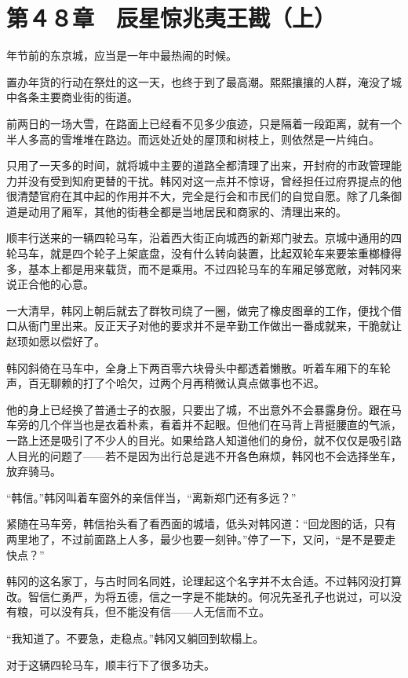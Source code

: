 \section{第４８章　辰星惊兆夷王戡（上）}

年节前的东京城，应当是一年中最热闹的时候。

置办年货的行动在祭灶的这一天，也终于到了最高潮。熙熙攘攘的人群，淹没了城中各条主要商业街的街道。

前两日的一场大雪，在路面上已经看不见多少痕迹，只是隔着一段距离，就有一个半人多高的雪堆堆在路边。而远处近处的屋顶和树枝上，则依然是一片纯白。

只用了一天多的时间，就将城中主要的道路全都清理了出来，开封府的市政管理能力并没有受到知府更替的干扰。韩冈对这一点并不惊讶，曾经担任过府界提点的他很清楚官府在其中起的作用并不大，完全是行会和市民们的自觉自愿。除了几条御道是动用了厢军，其他的街巷全都是当地居民和商家的、清理出来的。

顺丰行送来的一辆四轮马车，沿着西大街正向城西的新郑门驶去。京城中通用的四轮马车，就是四个轮子上架底盘，没有什么转向装置，比起双轮车来要笨重榔槺得多，基本上都是用来载货，而不是乘用。不过四轮马车的车厢足够宽敞，对韩冈来说正合他的心意。

一大清早，韩冈上朝后就去了群牧司绕了一圈，做完了橡皮图章的工作，便找个借口从衙门里出来。反正天子对他的要求并不是辛勤工作做出一番成就来，干脆就让赵顼如愿以偿好了。

韩冈斜倚在马车中，全身上下两百零六块骨头中都透着懒散。听着车厢下的车轮声，百无聊赖的打了个哈欠，过两个月再稍微认真点做事也不迟。

他的身上已经换了普通士子的衣服，只要出了城，不出意外不会暴露身份。跟在马车旁的几个伴当也是衣着朴素，看着并不起眼。但他们在马背上背挺腰直的气派，一路上还是吸引了不少人的目光。如果给路人知道他们的身份，就不仅仅是吸引路人目光的问题了——若不是因为出行总是逃不开各色麻烦，韩冈也不会选择坐车，放弃骑马。

“韩信。”韩冈叫着车窗外的亲信伴当，“离新郑门还有多远？”

紧随在马车旁，韩信抬头看了看西面的城墙，低头对韩冈道：“回龙图的话，只有两里地了，不过前面路上人多，最少也要一刻钟。”停了一下，又问，“是不是要走快点？”

韩冈的这名家丁，与古时同名同姓，论理起这个名字并不太合适。不过韩冈没打算改。智信仁勇严，为将五德，信之一字是不能缺的。何况先圣孔子也说过，可以没有粮，可以没有兵，但不能没有信——人无信而不立。

“我知道了。不要急，走稳点。”韩冈又躺回到软榻上。

对于这辆四轮马车，顺丰行下了很多功夫。

